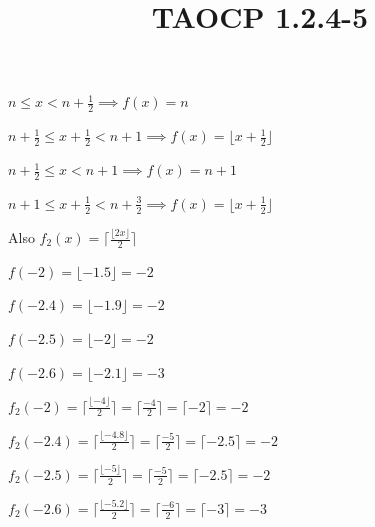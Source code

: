\documentclass{article}
\title{TAOCP 1.2.4\mbox{-}5}
\begin{document}
\maketitle

\( n \leq x < n + \frac{1}{2} \implies f(x) = n \)

\( n + \frac{1}{2} \leq x + \frac{1}{2} < n + 1 \implies f(x) = \lfloor x + \frac{1}{2} \rfloor \)

\( n + \frac{1}{2} \leq x < n + 1 \implies f(x) = n + 1 \)

\( n + 1 \leq x + \frac{1}{2} < n + \frac{3}{2} \implies f(x) = \lfloor x + \frac{1}{2} \rfloor \)

Also \( f_{2}(x)=\lceil\frac{\lfloor{2x}\rfloor}{2}\rceil \)

\( f(-2) = \lfloor -1.5 \rfloor = -2 \)

\( f(-2.4) = \lfloor -1.9 \rfloor = -2 \)

\( f(-2.5) = \lfloor -2 \rfloor = -2 \)

\( f(-2.6) = \lfloor -2.1 \rfloor = -3 \)

\( f_{2}(-2) = \lceil\frac{\lfloor{-4}\rfloor}{2}\rceil = \lceil\frac{-4}{2}\rceil = \lceil -2 \rceil = -2 \)

\( f_{2}(-2.4) = \lceil\frac{\lfloor{-4.8}\rfloor}{2}\rceil = \lceil\frac{-5}{2}\rceil = \lceil -2.5 \rceil = -2 \)

\( f_{2}(-2.5) = \lceil\frac{\lfloor{-5}\rfloor}{2}\rceil = \lceil\frac{-5}{2}\rceil = \lceil -2.5 \rceil = -2 \)

\( f_{2}(-2.6) = \lceil\frac{\lfloor{-5.2}\rfloor}{2}\rceil = \lceil\frac{-6}{2}\rceil = \lceil -3 \rceil = -3 \)
\end{document}
